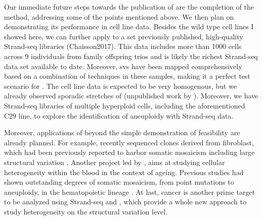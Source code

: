 Our immediate future steps towards the publication of \mc are the completion of
the method, addressing some of the points mentioned above. We then plan on
demonstrating its performance in cell line data. Besides the \rpe
wild type cell lines I showed here, we can further apply \mc to a set previously
published, high-quality Strand-seq libraries (Chaisson2017). This data
includes more than 1000 cells across 9 individuals from family offspring trios and
is likely the richest Strand-seq data set available to date. Moreover, \acp{sv}
have been mapped comprehensively based on a combination of techniques in these
samples, making it a perfect test scenario for \mc. The cell line data is
expected to be very homogenous, but we already observed sporadic stretches of
\loh (unpublished work by \david). Moreover, we have Strand-seq libraries of
multiple hyperploid cells, including the aforementioned \rpe C29
line, to explore the identification of aneuploidy with Strand-seq data.

Moreover, applications of \mc beyond the simple demonstration of feasibility are
already planned. For example, \ashley recently sequenced clones derived
from fibroblast, which had been previously reported to harbor somatic mosaicism
including large structural variation \citep{Saini2016}. Another project led by
\karen, aims at studying cellular heterogeneity within the blood in the context
of ageing. Previous studies had shown outstanding degrees of somatic mosaicism,
from point mutations to aneuploidy, in the hematopoietic lineage
\citep{Razzaghian2010,Holstege2014}. At last, cancer is another prime target to
be analyzed using Strand-seq and \mc, which provide a whole new approach to
study heterogeneity on the structural variation level.

